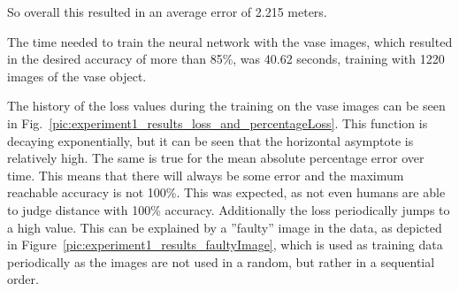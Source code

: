 So overall this resulted in an average error of 2.215 meters.

The time needed to train the neural network with the vase images, which resulted in the desired accuracy of more than 85\%, was 40.62 seconds, training with 1220 images of the vase object.

The history of the loss values during the training on the vase images can be seen in Fig.~\ref{pic:experiment1_results_loss_and_percentageLoss}. This function is decaying exponentially, but it can be seen that the horizontal asymptote is relatively high. The same is true for the mean absolute percentage error over time. This means that there will always be some error and the maximum reachable accuracy is not 100\%. This was expected, as not even humans are able to judge distance with 100\% accuracy. Additionally the loss periodically jumps to a high value. This can be explained by a ''faulty'' image in the data, as depicted in Figure~\ref{pic:experiment1_results_faultyImage}, which is used as training data periodically as the images are not used in a random, but rather in a sequential order.

